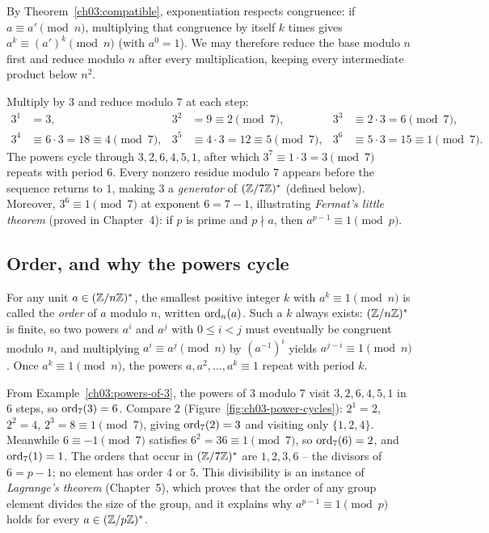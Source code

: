 By Theorem~\ref{ch03:compatible}, exponentiation respects congruence: if $a \equiv a' \pmod{n}$, multiplying that congruence by itself $k$ times gives $a^k \equiv (a')^k \pmod{n}$ (with $a^0 = 1$). We may therefore reduce the base modulo $n$ first and reduce modulo $n$ after every multiplication, keeping every intermediate product below $n^2$.

\begin{example}
\label{ch03:powers-of-3}
Multiply by $3$ and reduce modulo $7$ at each step:
\begin{align*}
  3^1 &= 3, &
  3^2 &= 9 \equiv 2 \pmod{7}, &
  3^3 &\equiv 2\cdot 3 = 6 \pmod{7}, \\
  3^4 &\equiv 6 \cdot 3 = 18 \equiv 4 \pmod{7}, &
  3^5 &\equiv 4\cdot 3 = 12 \equiv 5 \pmod{7}, &
  3^6 &\equiv 5\cdot 3 = 15 \equiv 1 \pmod{7}.
\end{align*}
The powers cycle through $3, 2, 6, 4, 5, 1$, after which $3^7 \equiv 1 \cdot 3 = 3 \pmod{7}$ repeats with period $6$. Every nonzero residue modulo $7$ appears before the sequence returns to $1$, making $3$ a \emph{generator} of $(\mathbb{Z}/7\mathbb{Z})^{*}$ (defined below). Moreover, $3^6 \equiv 1 \pmod{7}$ at exponent $6 = 7 - 1$, illustrating \emph{Fermat's little theorem} (proved in Chapter~4): if $p$ is prime and $p \nmid a$, then $a^{p-1} \equiv 1 \pmod{p}$.
\end{example}

\subsection{Order, and why the powers cycle}

For any unit $a \in (\mathbb{Z}/n\mathbb{Z})^{*}$, the smallest positive integer $k$ with $a^k \equiv 1 \pmod{n}$ is called the \emph{order} of $a$ modulo $n$, written $\operatorname{ord}_n(a)$. Such a $k$ always exists: $(\mathbb{Z}/n\mathbb{Z})^{*}$ is finite, so two powers $a^i$ and $a^j$ with $0 \le i < j$ must eventually be congruent modulo $n$, and multiplying $a^i \equiv a^j \pmod{n}$ by $(a^{-1})^i$ yields $a^{j-i} \equiv 1 \pmod{n}$. Once $a^k \equiv 1 \pmod{n}$, the powers $a, a^2, \dots, a^k \equiv 1$ repeat with period $k$.

\begin{example}
\label{ch03:orders-mod7}
From Example~\ref{ch03:powers-of-3}, the powers of $3$ modulo $7$ visit $3,2,6,4,5,1$ in $6$ steps, so $\operatorname{ord}_7(3) = 6$. Compare $2$ (Figure~\ref{fig:ch03-power-cycles}): $2^1 = 2$, $2^2 = 4$, $2^3 = 8 \equiv 1 \pmod{7}$, giving $\operatorname{ord}_7(2) = 3$ and visiting only $\{1,2,4\}$. Meanwhile $6 \equiv -1 \pmod{7}$ satisfies $6^2 = 36 \equiv 1 \pmod{7}$, so $\operatorname{ord}_7(6) = 2$, and $\operatorname{ord}_7(1) = 1$. The orders that occur in $(\mathbb{Z}/7\mathbb{Z})^{*}$ are $1, 2, 3, 6$ -- the divisors of $6 = p - 1$; no element has order $4$ or $5$. This divisibility is an instance of \emph{Lagrange's theorem} (Chapter~5), which proves that the order of any group element divides the size of the group, and it explains why $a^{p-1} \equiv 1 \pmod{p}$ holds for every $a \in (\mathbb{Z}/p\mathbb{Z})^{*}$.
\end{example}

